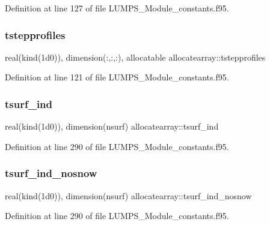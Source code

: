 Definition at line 127 of file L\+U\+M\+P\+S\+\_\+\+Module\+\_\+constants.\+f95.

\mbox{\label{namespaceallocatearray_a55a6f7a4814f569e03bd6f5fd947f6b2}} 
\subsubsection{\texorpdfstring{tstepprofiles}{tstepprofiles}}
{\footnotesize\ttfamily real(kind(1d0)), dimension(\+:,\+:,\+:), allocatable allocatearray\+::tstepprofiles}



Definition at line 121 of file L\+U\+M\+P\+S\+\_\+\+Module\+\_\+constants.\+f95.

\mbox{\label{namespaceallocatearray_a8ff59bff050fb421cbb0626422a102c6}} 
\subsubsection{\texorpdfstring{tsurf\+\_\+ind}{tsurf\_ind}}
{\footnotesize\ttfamily real(kind(1d0)), dimension(nsurf) allocatearray\+::tsurf\+\_\+ind}



Definition at line 290 of file L\+U\+M\+P\+S\+\_\+\+Module\+\_\+constants.\+f95.

\mbox{\label{namespaceallocatearray_a18f9679fabfeae9ce40c8f9778d6fa0f}} 
\subsubsection{\texorpdfstring{tsurf\+\_\+ind\+\_\+nosnow}{tsurf\_ind\_nosnow}}
{\footnotesize\ttfamily real(kind(1d0)), dimension(nsurf) allocatearray\+::tsurf\+\_\+ind\+\_\+nosnow}



Definition at line 290 of file L\+U\+M\+P\+S\+\_\+\+Module\+\_\+constants.\+f95.

